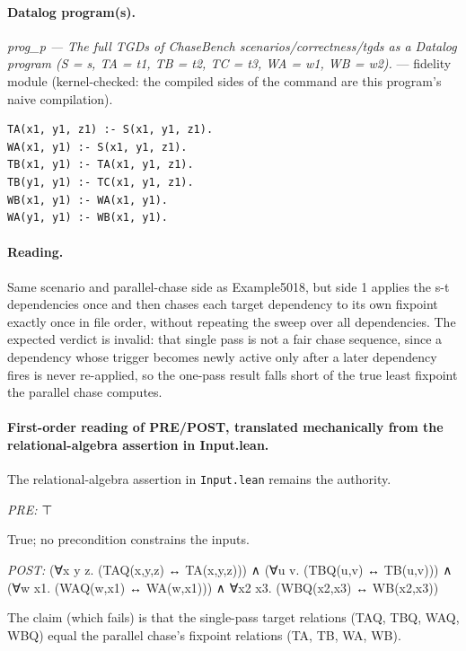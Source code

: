 \documentclass[10pt]{article}
\begin{document}
\paragraph{Datalog program(s).}

{\raggedright\textit{prog\_p --- The full TGDs of ChaseBench scenarios/correctness/tgds as a Datalog program (S = s, TA = t1, TB = t2, TC = t3, WA = w1, WB = w2).} --- fidelity module (kernel-checked: the compiled sides of the command are this program's naive compilation).\par}

\begin{Verbatim}[fontsize=\scriptsize,breaklines=true,breakanywhere=true,frame=single,framesep=1.5mm]
TA(x1, y1, z1) :- S(x1, y1, z1).
WA(x1, y1) :- S(x1, y1, z1).
TB(x1, y1) :- TA(x1, y1, z1).
TB(y1, y1) :- TC(x1, y1, z1).
WB(x1, y1) :- WA(x1, y1).
WA(y1, y1) :- WB(x1, y1).
\end{Verbatim}

\paragraph{Reading.} Same scenario and parallel-chase side as Example5018, but side 1 applies the s-t dependencies once and then chases each target dependency to its own fixpoint exactly once in file order, without repeating the sweep over all dependencies. The expected verdict is invalid: that single pass is not a fair chase sequence, since a dependency whose trigger becomes newly active only after a later dependency fires is never re-applied, so the one-pass result falls short of the true least fixpoint the parallel chase computes.

\paragraph{First-order reading of PRE/POST, translated mechanically from the relational-algebra assertion in Input.lean.} The relational-algebra assertion in \texttt{Input.lean} remains the authority.

\textit{PRE:} ⊤\par True; no precondition constrains the inputs.

\textit{POST:} (∀x y z. (TAQ(x,y,z) ↔ TA(x,y,z))) ∧ (∀u v. (TBQ(u,v) ↔ TB(u,v))) ∧ (∀w x1. (WAQ(w,x1) ↔ WA(w,x1))) ∧ ∀x2 x3. (WBQ(x2,x3) ↔ WB(x2,x3))\par The claim (which fails) is that the single-pass target relations (TAQ, TBQ, WAQ, WBQ) equal the parallel chase's fixpoint relations (TA, TB, WA, WB).
\end{document}
